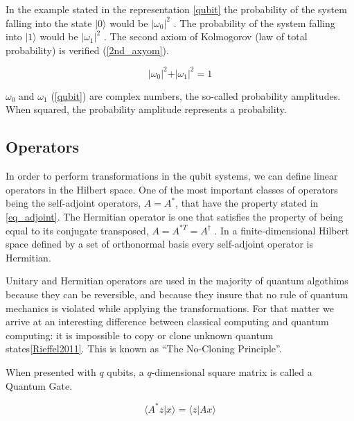 In the example stated in the representation \ref{qubit} the probability of the system falling into the state $\vert 0 \rangle $ would be $\vert\omega_{0}\vert^{2}$ . The probability of the system falling into $\vert 1 \rangle $ would be $\vert\omega_{1}\vert^{2}$ . The second axiom of Kolmogorov (law of total probability) is verified (\ref{2nd_axyom}).

\begin{equation}
\label{2nd_axyom}
\vert\omega_{0}\vert^{2}+\vert\omega_{1}\vert^{2}=1
\end{equation}

 
$\omega_{0}$ and $\omega_{1}$ (\ref{qubit}) are complex numbers, the so-called probability amplitudes. When squared, the probability amplitude represents a probability. 

\subsection{Operators}
\label{subsec:QCoperators}

In order to perform transformations in the qubit systems, we can define linear operators in the Hilbert space. One of the most important classes of operators being the self-adjoint operators,  $A = A^{*}$, that have the property stated in \ref{eq_adjoint}. The Hermitian operator is one that satisfies the property of being equal to its conjugate transposed, $A = A^{*T} =A^\dagger$ .  In a finite-dimensional Hilbert space defined by a set of orthonormal basis every self-adjoint operator is Hermitian. 

Unitary and Hermitian operators are used in the majority of quantum algothims because they can be reversible, and because they insure that no rule of quantum mechanics is violated while applying the transformations. For that matter we arrive at an interesting difference between classical computing and quantum computing: it is impossible to copy or clone unknown quantum states\ref{Rieffel2011}. This is known as ``The No-Cloning Principle''.

When presented with $q$ qubits, a $q$-dimensional square matrix is called a Quantum Gate.

\begin{equation}
\label{eq_adjoint}
\langle A^{*}z\vert x\rangle=\langle z\vert Ax\rangle
\end{equation}

